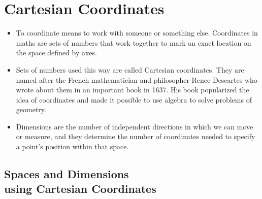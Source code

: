 \documentclass{article}
\begin{document}
\bigskip

\begin{center}
\end{center}

\section*{Cartesian Coordinates}

\begin{itemize}
    \item To coordinate means to work with someone or something else. Coordinates in maths are sets of numbers that work together to mark an exact location on the space defined by axes.
    \item Sets of numbers used this way are called Cartesian coordinates. They are named after the French mathematician and philosopher Renee Descartes who wrote about them in an important book in 1637. His book popularized the idea of coordinates and made it possible to use algebra to solve problems of geometry.
    \item Dimensions are the number of independent directions in which we can move or measure, and they determine the number of coordinates needed to specify a point's position within that space.
\end{itemize}

\newpage

\subsection*{Spaces and Dimensions\\using Cartesian Coordinates}
\end{document}
